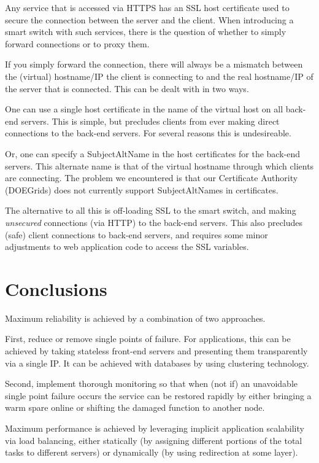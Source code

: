\documentclass[letterpaper]{jpconf}
\begin{document}
Any service that is accessed via HTTPS has an SSL host certificate used to
secure the connection between the server and the client. When introducing a
smart switch with such services, there is the question of whether to simply
forward connections or to proxy them. 

If you simply forward the connection, there will always be a mismatch between
the (virtual) hostname/IP the client is connecting to and the real hostname/IP
of the server that is connected. This can be dealt with in two ways. 

One can use a single host certificate in the name of the virtual host on all
back-end servers. This is simple, but precludes clients from ever making direct
connections to the back-end servers. For several reasons this is undesireable. 

Or, one can specify a SubjectAltName in the host certificates for the back-end
servers. This alternate name is that of the virtual hostname through which 
clients are connecting. The problem we encountered is that our Certificate
Authority (DOEGrids) does not currently support SubjectAltNames in
certificates. 

The alternative to all this is off-loading SSL to the smart switch, and making
{\it unsecured} connections (via HTTP) to the back-end servers. This also
precludes (safe) client connections to back-end servers, and requires some
minor adjustments to web application code to access the SSL variables. 


\section{Conclusions}

Maximum reliability is achieved by a combination of two approaches. 

First, reduce or remove single points of failure. For applications, this can be
achieved by taking stateless front-end servers and presenting them transparently via a
single IP. It can be achieved with databases by using clustering technology. 

Second, implement thorough monitoring so that when (not if) an unavoidable
single point failure occurs the service can be restored rapidly by either 
bringing a warm spare online or shifting the damaged function
to another node. 

Maximum performance is achieved by leveraging implicit application
scalability via load balancing, either statically (by assigning different portions of the
total tasks to different servers) or dynamically (by using redirection at some
layer).
\end{document}
